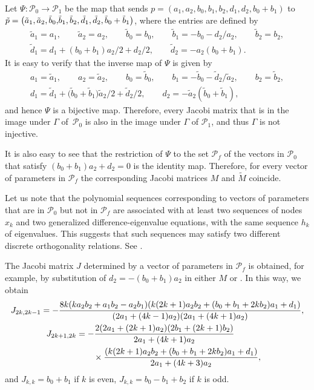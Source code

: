 \documentclass[10pt,a4paper]{amsart}
\def\cP{\mathcal P}
\numberwithin{equation}{section}
\begin{document}
Let $\Psi\colon \cP_0 \rightarrow \cP_1$ be the map that sends $p=(a_1, a_2, b_0, b_1, b_2, d_1,d_2, b_0+b_1)$ to $\tilde p=\smash{\bigl(\tilde a_1,\tilde a_2,\tilde b_0,} \allowbreak \smash{\tilde b_1,\tilde b_2,\tilde d_1,\tilde d_2,\tilde b_0+ \tilde b_1\bigr)}$, where the entries are defined by
\begin{gather*}
\tilde a_1=a_1,\qquad \tilde a_2=a_2, \qquad \tilde b_0=b_0,\qquad \tilde b_1= -b_0 -d_2/a_2,\qquad \tilde b_2=b_2, \\
\tilde d_1=d_1+(b_0+b_1) a_2/2 + d_2/2,\qquad \tilde d_2=-a_2 (b_0+b_1).
\end{gather*}
It is easy to verify that the inverse map of $\Psi$ is given by
\begin{gather*}
 a_1=\tilde a_1,\qquad a_2=\tilde a_2, \qquad b_0=\tilde b_0,\qquad b_1= -\tilde b_0 -\tilde d_2/\tilde a_2,\qquad b_2=\tilde b_2, \\
d_1=\tilde d_1+\bigl(\tilde b_0+\tilde b_1\bigr) \tilde a_2/2 + \tilde d_2/2,\qquad d_2=-\tilde a_2 (\tilde b_0+\tilde b_1),
\end{gather*}
and hence $\Psi$ is a bijective map. Therefore, every Jacobi matrix that is in the image under $\Gamma$ of~$\cP_0$ is also in the image under $\Gamma$ of $\cP_1$, and thus $\Gamma$ is not injective.

It is also easy to see that the restriction of $\Psi$ to the set $\cP_f$ of the vectors in $\cP_0$ that satisfy $(b_0+b_1) a_2+d_2=0$ is the identity map.
Therefore, for every vector of parameters in $\cP_f$ the corresponding Jacobi matrices $M$ and $\tilde M$ coincide.

Let us note that the polynomial sequences corresponding to vectors of parameters that are in $\cP_0$ but not in $\cP_f$ are associated with at least two sequences of nodes $x_k$ and two generalized difference-eigenvalue equations, with the same sequence $h_k$ of eigenvalues. This suggests that such sequences may satisfy two different discrete orthogonality relations. See \cite{qdiscr}.

The Jacobi matrix $J$ determined by a vector of parameters in $\cP_f$ is obtained, for example, by substitution of $d_2=-(b_0+b_1)a_2$ in either $M$ or . In this way, we obtain %
\begin{gather*}%
	J_{2k,2k-1}= -\dfrac{8k(k a_2 b_2+ a_1 b_2-a_2 b_1) ( k(2k+1) a_2 b_2+(b_0+b_1+2 k b_2)a_1+d_1)}{(2 a_1+(4k-1) a_2) (2 a_1+(4k+1) a_2)},
\\
	J_{2k+1,2k}=-\dfrac{2 (2 a_1+(2k+1)a_2) (2 b_1 + ( 2k+1) b_2)}{2 a_1+(4k+1) a_2} \qquad \qquad \nonumber \\
\hphantom{J_{2k+1,2k}=}\hspace{0.25mm}{}
 \times 	\dfrac{( k(2k+1) a_2 b_2+(b_0+b_1+2 k b_2)a_1+d_1)}{2 a_1 +(4k+3) a_2}, \nonumber
\end{gather*}
and
$%
	J_{k,k}= b_0+b_1$ if $k$ is even,
	$J_{k,k}= b_0-b_1+b_2$ if $k$ is odd.
\end{document}
